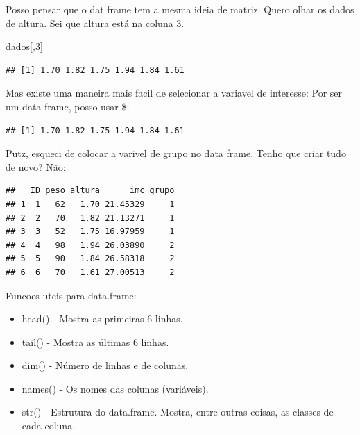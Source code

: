 \documentclass[
]{book}
\newenvironment{Shaded}{\begin{snugshade}}{\end{snugshade}}
\newcommand{\DecValTok}[1]{\textcolor[rgb]{0.00,0.00,0.81}{#1}}
\newcommand{\KeywordTok}[1]{\textcolor[rgb]{0.13,0.29,0.53}{\textbf{#1}}}
\newcommand{\NormalTok}[1]{#1}
\newcommand{\OperatorTok}[1]{\textcolor[rgb]{0.81,0.36,0.00}{\textbf{#1}}}
\newcommand{\StringTok}[1]{\textcolor[rgb]{0.31,0.60,0.02}{#1}}
\begin{document}
Posso pensar que o dat frame tem a mesma ideia de matriz. Quero olhar os dados de altura. Sei que altura está na coluna 3.

\begin{Shaded}
\begin{Highlighting}[]
\NormalTok{dados[,}\DecValTok{3}\NormalTok{]}
\end{Highlighting}
\end{Shaded}

\begin{verbatim}
## [1] 1.70 1.82 1.75 1.94 1.84 1.61
\end{verbatim}

Mas existe uma maneira mais facil de selecionar a variavel de interesse:
Por ser um data frame, posso usar \$:

\begin{Shaded}
\end{Shaded}

\begin{verbatim}
## [1] 1.70 1.82 1.75 1.94 1.84 1.61
\end{verbatim}

Putz, esqueci de colocar a varivel de grupo no data frame. Tenho que criar tudo de novo? Não:

\begin{Shaded}
\end{Shaded}

\begin{verbatim}
##   ID peso altura      imc grupo
## 1  1   62   1.70 21.45329     1
## 2  2   70   1.82 21.13271     1
## 3  3   52   1.75 16.97959     1
## 4  4   98   1.94 26.03890     2
## 5  5   90   1.84 26.58318     2
## 6  6   70   1.61 27.00513     2
\end{verbatim}

Funcoes uteis para data.frame:

\begin{itemize}
\item
  head() - Mostra as primeiras 6 linhas.
\item
  tail() - Mostra as últimas 6 linhas.
\item
  dim() - Número de linhas e de colunas.
\item
  names() - Os nomes das colunas (variáveis).
\item
  str() - Estrutura do data.frame. Mostra, entre outras coisas, as classes de cada coluna.
\end{itemize}
\end{document}
